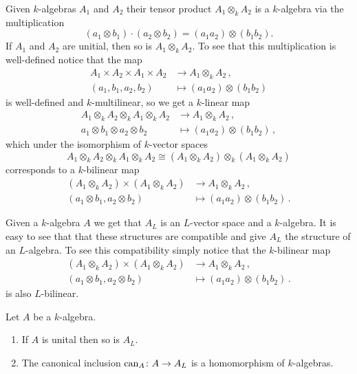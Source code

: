 Given $k$-algebras $A_1$ and $A_2$ their tensor product $A_1 \otimes_k A_2$ is a $k$-algebra via the multiplication
\[
    (a_1 \otimes b_1) \cdot (a_2 \otimes b_2)
  = (a_1 a_2) \otimes (b_1 b_2).
\]
If $A_1$ and $A_2$ are unitial, then so is $A_1 \otimes_k A_2$.
To see that this multiplication is well-defined notice that the map
\begin{align*}
            A_1 \times A_2 \times A_1 \times A_2
  &\to      A_1 \otimes_k A_2 \,, \\
            (a_1, b_1, a_2, b_2)
  &\mapsto  (a_1 a_2) \otimes (b_1 b_2)
\end{align*}
is well-defined and $k$-multilinear, so we get a $k$-linear map
\begin{align*}
            A_1 \otimes_k A_2 \otimes_k A_1 \otimes_k A_2
  &\to      A_1 \otimes_k A_2 \,, \\
            a_1 \otimes b_1 \otimes a_2 \otimes b_2
  &\mapsto  (a_1 a_2) \otimes (b_1 b_2) \,,
\end{align*}
which under the isomorphism of $k$-vector spaces
\[
        A_1 \otimes_k A_2 \otimes_k A_1 \otimes_k A_2
  \cong (A_1 \otimes_k A_2) \otimes_k (A_1 \otimes_k A_2)
\]
corresponds to a $k$-bilinear map
\begin{align*}
            (A_1 \otimes_k A_2) \times (A_1 \otimes_k A_2)
  &\to      A_1 \otimes_k A_2 \,, \\
            (a_1 \otimes b_1, a_2 \otimes b_2)
  &\mapsto  (a_1 a_2) \otimes (b_1 b_2) \,.
\end{align*}


Given a $k$-algebra $A$ we get that $A_L$ is an $L$-vector space and a $k$-algebra.
It is easy to see that that these structures are compatible and give $A_L$ the structure of an $L$-algebra.
To see this compatibility simply notice that the $k$-bilinear map
\begin{align*}
            (A_1 \otimes_k A_2) \times (A_1 \otimes_k A_2)
  &\to      A_1 \otimes_k A_2 \,, \\
            (a_1 \otimes b_1, a_2 \otimes b_2)
  &\mapsto  (a_1 a_2) \otimes (b_1 b_2) \,.
\end{align*}
is also $L$-bilinear.


\begin{remark}
  Let $A$ be a $k$-algebra.
  \begin{enumerate}[label=\emph{\alph*)},leftmargin=*]
    \item
    If $A$ is unital then so is $A_L$.
    \item
    The canonical inclusion $\operatorname{can}_A \colon A \to A_L$ is a homomorphism of $k$-algebras.
  \end{enumerate}
\end{remark}


